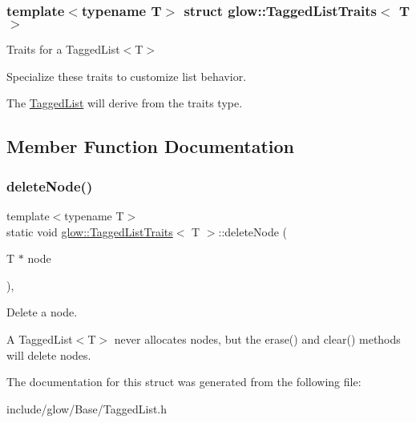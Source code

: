 \subsubsection*{template$<$typename T$>$\newline
struct glow\+::\+Tagged\+List\+Traits$<$ T $>$}

Traits for a Tagged\+List$<$\+T$>$

Specialize these traits to customize list behavior.

The \hyperlink{classglow_1_1_tagged_list}{Tagged\+List} will derive from the traits type. 

\subsection{Member Function Documentation}
\mbox{\label{structglow_1_1_tagged_list_traits_ab0384ec6c328482503d0ecf3cc8e7d05}} 
\subsubsection{\texorpdfstring{delete\+Node()}{deleteNode()}}
{\footnotesize\ttfamily template$<$typename T$>$ \\
static void \hyperlink{structglow_1_1_tagged_list_traits}{glow\+::\+Tagged\+List\+Traits}$<$ T $>$\+::delete\+Node (\begin{DoxyParamCaption}\item[{T $\ast$}]{node }\end{DoxyParamCaption})\hspace{0.3cm}{\ttfamily [inline]}, {\ttfamily [static]}}

Delete a node.

A Tagged\+List$<$\+T$>$ never allocates nodes, but the erase() and clear() methods will delete nodes. 

The documentation for this struct was generated from the following file\+:\begin{DoxyCompactItemize}
\item 
include/glow/\+Base/Tagged\+List.\+h\end{DoxyCompactItemize}
